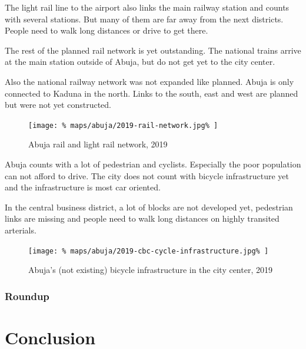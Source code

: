 \documentclass[twocolumn]{article}
\begin{document}
			The light rail line to the airport also links the main railway station and counts with several stations. But many of them are far away from the next districts. People need to walk long distances or drive to get there.
			
			The rest of the planned rail network is yet outstanding. The national trains arrive at the main station outside of Abuja, but do not get yet to the city center.
			
			Also the national railway network was not expanded like planned. Abuja is only connected to Kaduna in the north. Links to the south, east and west are planned but were not yet constructed.
			
			\begin{figure}[H]
				\texttt{[image: \%
					maps/abuja/2019-rail-network.jpg\%
				]}
				\caption{Abuja rail and light rail network, 2019\cite{ResearchGate:AbujaBusRouteNetwork}}
				\label{fig:map:abuja-rail-network-2019}
			\end{figure}
			
			Abuja counts with a lot of pedestrian and cyclists. Especially the poor population can not afford to drive.
			The city does not count with bicycle infrastructure yet and the infrastructure is most car oriented.
			
			In the central business district, a lot of blocks are not developed yet, pedestrian links are missing and people need to walk long distances on highly transited arterials.
			
			\begin{figure}[H]
				\texttt{[image: \%
					maps/abuja/2019-cbc-cycle-infrastructure.jpg\%
				]}
				\caption{Abuja's (not existing) bicycle infrastructure in the city center, 2019\cite{OpenCycleMap:Abuja}}
				\label{fig:map:abuja-bicycle-map-2019}
			\end{figure}	
			
			
			\subsubsection{Roundup}
			
			


	\clearpage
	\section{Conclusion}
\end{document}
